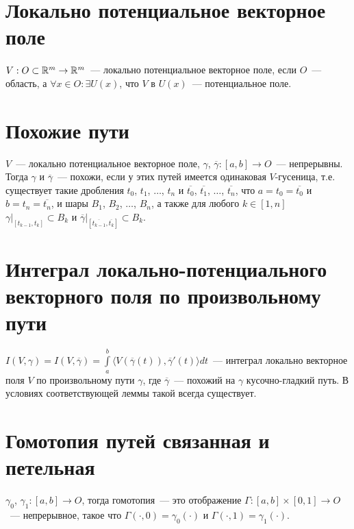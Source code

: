 \documentclass{article}
\begin{document}
    \newpage
    
    \section{Локально потенциальное векторное поле}
    
        $V : O \subset \mathbb{R}^m \rightarrow \mathbb{R}^m$~--- локально потенциальное векторное поле, если $O$~--- область, а $\forall x \in O : \exists U(x)$, что $V$ в $U(x)$~--- потенциальное поле.
        
    \newpage
    
    \section{Похожие пути}
    
        $V$~--- локально потенциальное векторное поле, $\gamma$, $\overline{\gamma} : [a, b] \rightarrow O$~--- непрерывны. Тогда $\gamma$ и $\overline{\gamma}$~--- похожи, если у этих путей имеется одинаковая $V$-гусеница, т.е. существует такие дробления $t_0$, $t_1$, $\ldots$, $t_n$ и $\overline{t_0}$, $\overline{t_1}$, $\ldots$, $\overline{t_n}$, что $a = t_0 = \overline{t_0}$ и $b = t_n = \overline{t_n}$, и шары $B_1$, $B_2$, $\ldots$, $B_n$, а также для любого $k \in [1, n]$ $\gamma \big|_{[t_{k - 1}, t_k]} \subset B_k$ и $\overline{\gamma} \big|_{[\overline{t_{k - 1}}, \overline{t_k}]} \subset B_k$.
        
    \newpage
    
    \section{Интеграл локально-потенциального векторного поля по произвольному пути}
    
        $I(V, \gamma) = I(V, \overline{\gamma}) = \int\limits^b_a \langle V \left( \overline{\gamma}(t) \right), \overline{\gamma}'(t) \rangle dt$~--- интеграл локально векторное поля $V$ по произвольному пути $\gamma$, где $\overline{\gamma}$~--- похожий на $\gamma$ кусочно-гладкий путь. В условиях соответствующей леммы такой всегда существует.
        
    \newpage
    
    \section{Гомотопия путей связанная и петельная}
    
        $\gamma_0$, $\gamma_1 : [a, b] \rightarrow O$, тогда гомотопия~--- это отображение $\Gamma : [a, b] \times [0, 1] \rightarrow O$~--- непрерывное, такое что $\Gamma(\cdot, 0) = \gamma_0(\cdot)$ и $\Gamma(\cdot, 1) = \gamma_1(\cdot)$.
        
\end{document}
